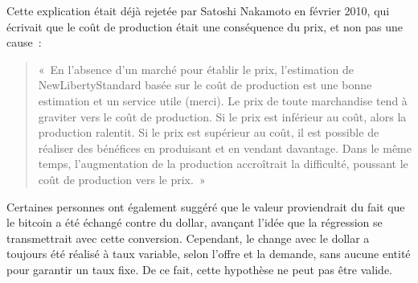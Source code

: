 Cette explication était déjà rejetée par Satoshi Nakamoto en février 2010, qui écrivait que le coût de production était une conséquence du prix, et non pas une cause~:

\begin{quote}
«~En l'absence d'un marché pour établir le prix, l'estimation de NewLibertyStandard basée sur le coût de production est une bonne estimation et un service utile (merci). Le prix de toute marchandise tend à graviter vers le coût de production. Si le prix est inférieur au coût, alors la production ralentit. Si le prix est supérieur au coût, il est possible de réaliser des bénéfices en produisant et en vendant davantage. Dans le même temps, l'augmentation de la production accroîtrait la difficulté, poussant le coût de production vers le prix.~»
\end{quote}


Certaines personnes ont également suggéré que le valeur proviendrait du fait que le bitcoin a été échangé contre du dollar, avançant l'idée que la régression se transmettrait avec cette conversion. Cependant, le change avec le dollar a toujours été réalisé à taux variable, selon l'offre et la demande, sans aucune entité pour garantir un taux fixe. De ce fait, cette hypothèse ne peut pas être valide.



